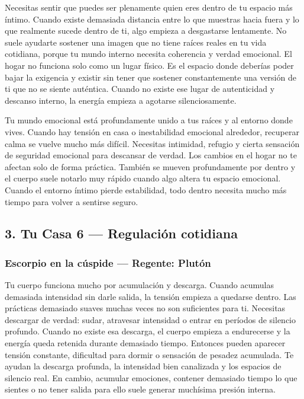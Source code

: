 \documentclass[11pt,a4paper]{article}
\begin{document}
Necesitas sentir que puedes ser plenamente quien eres dentro de tu espacio más íntimo. Cuando existe demasiada distancia entre lo que muestras hacia fuera y lo que realmente sucede dentro de ti, algo empieza a desgastarse lentamente. No suele ayudarte sostener una imagen que no tiene raíces reales en tu vida cotidiana, porque tu mundo interno necesita coherencia y verdad emocional. El hogar no funciona solo como un lugar físico. Es el espacio donde deberías poder bajar la exigencia y existir sin tener que sostener constantemente una versión de ti que no se siente auténtica. Cuando no existe ese lugar de autenticidad y descanso interno, la energía empieza a agotarse silenciosamente.

Tu mundo emocional está profundamente unido a tus raíces y al entorno donde vives. Cuando hay tensión en casa o inestabilidad emocional alrededor, recuperar calma se vuelve mucho más difícil. Necesitas intimidad, refugio y cierta sensación de seguridad emocional para descansar de verdad. Los cambios en el hogar no te afectan solo de forma práctica. También se mueven profundamente por dentro y el cuerpo suele notarlo muy rápido cuando algo altera tu espacio emocional. Cuando el entorno íntimo pierde estabilidad, todo dentro necesita mucho más tiempo para volver a sentirse seguro.

\vspace{0.8cm}

\subsection{3. Tu Casa 6 — Regulación cotidiana}

\subsubsection*{Escorpio en la cúspide — Regente: Plutón}

Tu cuerpo funciona mucho por acumulación y descarga. Cuando acumulas demasiada intensidad sin darle salida, la tensión empieza a quedarse dentro. Las prácticas demasiado suaves muchas veces no son suficientes para ti. Necesitas descargar de verdad: sudar, atravesar intensidad o entrar en períodos de silencio profundo. Cuando no existe esa descarga, el cuerpo empieza a endurecerse y la energía queda retenida durante demasiado tiempo. Entonces pueden aparecer tensión constante, dificultad para dormir o sensación de pesadez acumulada. Te ayudan la descarga profunda, la intensidad bien canalizada y los espacios de silencio real. En cambio, acumular emociones, contener demasiado tiempo lo que sientes o no tener salida para ello suele generar muchísima presión interna.
\end{document}
